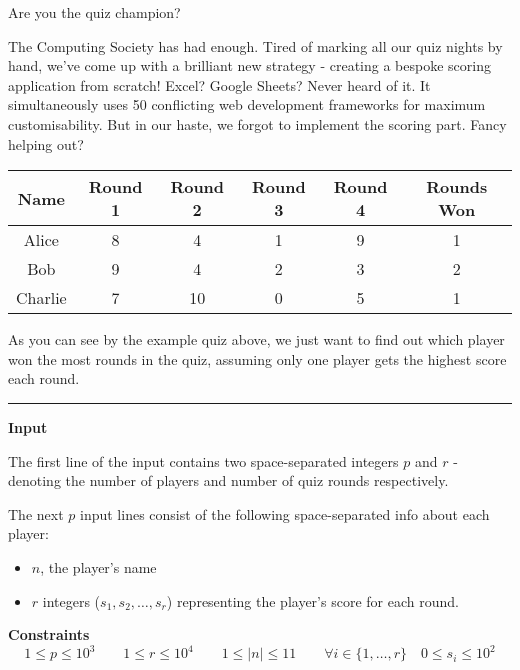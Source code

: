 \togglefalse{IsScore}
{Are you the quiz champion?}

The Computing Society has had enough. 
Tired of marking all our quiz nights by hand, we've come up with a brilliant new strategy - creating a bespoke scoring application from scratch! 
Excel? 
Google Sheets? 
Never heard of it.
It simultaneously uses 50 conflicting web development frameworks for maximum customisability. 
But in our haste, we forgot to implement the scoring part.
Fancy helping out?

\begin{table}[h]
    \centering
    \begin{tabular}{|c|c|c|c|c|c|}
        \hline
        \textbf{Name} & Round 1 & Round 2 & Round 3 & Round 4 & \textbf{Rounds Won} \\
        \hline
        Alice & 8 & 4 & 1 & \cellcolor{uwcsblue}9 & 1\\
        Bob & \cellcolor{uwcsblue}9 & 4 & \cellcolor{uwcsblue}2 & 3 & \cellcolor{uwcsyellow}2 \\
        Charlie & 7 & \cellcolor{uwcsblue}10 & 0 & 5 & 1 \\
        \hline
    \end{tabular}
\end{table}

As you can see by the example quiz above, we just want to find out which player won the most rounds in the quiz, 
assuming only one player gets the highest score each round.

\vspace{8pt}
\hrule

\textbf{Input}

The first line of the input contains two space-separated integers $p$ and $r$ 
- denoting the number of players and number of quiz rounds respectively.

The next $p$ input lines consist of the following space-separated info about each player:
\begin{itemize}
    \item $n$, the player's name
    \item $r$ integers ($s_1, s_2, \dots, s_r$) representing the player's score for each round.
\end{itemize}

\textbf{Constraints}
\begin{equation*}
    1 \leq p \leq 10^3 \qquad 
    1 \leq r \leq 10^4 \qquad 
    1 \leq |n| \leq 11 \qquad 
    \forall i \in \{1, \dots, r\} \quad 0 \leq s_i \leq 10^2
\end{equation*}

